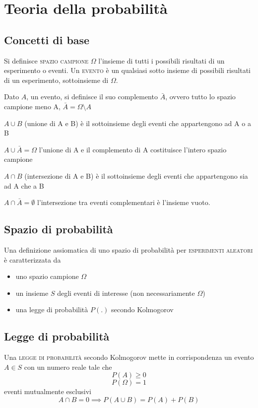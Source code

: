 \chapter{Teoria della probabilità}

\section{Concetti di base}
Si definisce \textsc{spazio campione $\Omega$} l'insieme di tutti i possibili risultati di un esperimento o eventi. Un \textsc{evento} è un qualsiasi sotto insieme di possibili risultati di un esperimento, sottoinsieme di $\Omega$.

Dato $A$, un evento, si definisce il suo complemento $\bar{A}$, ovvero tutto lo spazio campione meno A, $\bar{A}=\Omega\setminus A$

$A\cup B$ (unione di A e B) è il sottoinsieme degli eventi che appartengono ad A o a B

$A\cup\bar{A}=\Omega$ l'unione di A e il complemento di A costituisce l'intero spazio campione

$A\cap B$ (intersezione di A e B) è il sottoinsieme degli eventi che appartengono sia ad A che a B

$A\cap\bar{A}=\emptyset$ l'intersezione tra eventi complementari è l'insieme vuoto.

\section{Spazio di probabilità}
Una definizione assiomatica di uno spazio di probabilità per \textsc{esperimenti aleatori} è caratterizzata da
\begin{itemize}
\item uno spazio campione $\Omega$
\item un insieme $S$ degli eventi di interesse (non necessariamente $\Omega$)
\item una legge di probabilità $P(.)$ secondo Kolmogorov
\end{itemize}

\section{Legge di probabilità}
Una \textsc{legge di probabilità} secondo Kolmogorov mette in corrispondenza un evento $A\in S$ con un numero reale tale che
\begin{equation}P(A)\geq 0\end{equation}
\begin{equation}P(\Omega)=1\end{equation}
eventi mutualmente esclusivi \begin{equation}A\cap B=0\implies P(A\cup B)=P(A)+P(B)\end{equation}

